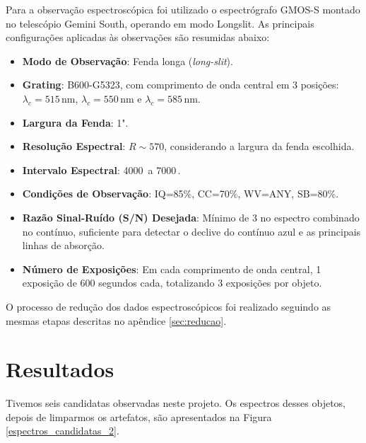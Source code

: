 Para a observação espectroscópica foi utilizado o espectrógrafo GMOS-S montado no telescópio Gemini South, operando em modo Longslit. As principais configurações aplicadas às observações são resumidas abaixo:

\begin{itemize}
    \item \textbf{Modo de Observação}: Fenda longa (\textit{long-slit}).
    \item \textbf{Grating}: B600-G5323, com comprimento de onda central em 3 posições: $\lambda_c = 515 \, \text{nm}$, $\lambda_c = 550 \, \text{nm}$ e $\lambda_c = 585 \, \text{nm}$.
    \item \textbf{Largura da Fenda}: 1".
    \item \textbf{Resolução Espectral}: $R \sim 570$, considerando a largura da fenda escolhida.
    \item \textbf{Intervalo Espectral}: 4000\, a 7000\,.
    \item \textbf{Condições de Observação}: IQ=85\%, CC=70\%, WV=ANY, SB=80\%.
    \item \textbf{Razão Sinal-Ruído (S/N) Desejada}: Mínimo de 3 no espectro combinado no contínuo, suficiente para detectar o declive do contínuo azul e as principais linhas de absorção.
    \item \textbf{Número de Exposições}: Em cada comprimento de onda central, 1 exposição de 600 segundos cada, totalizando 3 exposições por objeto.
\end{itemize}

O processo de redução dos dados espectroscópicos foi realizado seguindo as mesmas etapas descritas no apêndice \ref{sec:reducao}.

\section{Resultados}\label{section:resultado_espectros_emissao}

Tivemos seis candidatas observadas neste projeto. Os espectros desses objetos, depois de limparmos os artefatos, são apresentados na Figura \ref{espectros_candidatas_2}.

